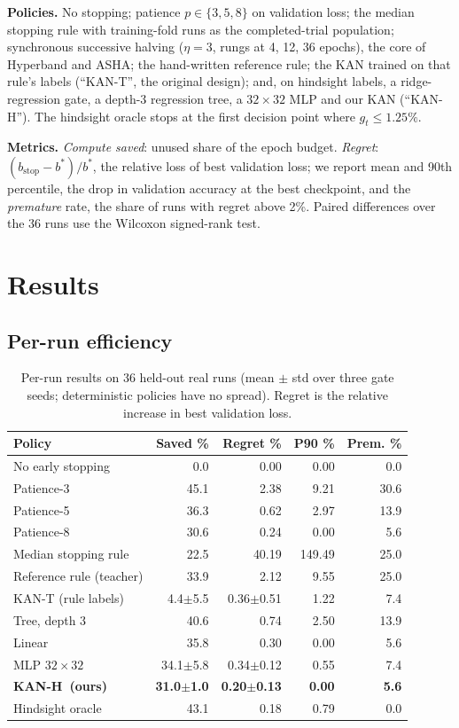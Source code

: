 \documentclass[conference]{IEEEtran}
\newcommand{\ours}{KAN-H}
\begin{document}
\textbf{Policies.} No stopping; patience $p\in\{3,5,8\}$ on validation loss; the median stopping rule with training-fold runs as the completed-trial population; synchronous successive halving ($\eta=3$, rungs at 4, 12, 36 epochs), the core of Hyperband and ASHA; the hand-written reference rule; the KAN trained on that rule's labels (``KAN-T'', the original design); and, on hindsight labels, a ridge-regression gate, a depth-3 regression tree, a $32{\times}32$ MLP and our KAN (``\ours''). The hindsight oracle stops at the first decision point where $g_t\le1.25\%$.

\textbf{Metrics.} \emph{Compute saved}: unused share of the epoch budget. \emph{Regret}: $(b_{\text{stop}}-b^\ast)/b^\ast$, the relative loss of best validation loss; we report mean and 90th percentile, the drop in validation accuracy at the best checkpoint, and the \emph{premature} rate, the share of runs with regret above 2\%. Paired differences over the 36 runs use the Wilcoxon signed-rank test.

\section{Results}
\subsection{Per-run efficiency}
\begin{table}[t]
\centering
\caption{Per-run results on 36 held-out real runs (mean $\pm$ std over three gate seeds; deterministic policies have no spread). Regret is the relative increase in best validation loss.}
\label{tab:main}
\setlength{\tabcolsep}{3pt}
\begin{tabular}{lrrrr}
\toprule
Policy & Saved \% & Regret \% & P90 \% & Prem. \% \\
\midrule
No early stopping & 0.0 & 0.00 & 0.00 & 0.0 \\
Patience-3 & 45.1 & 2.38 & 9.21 & 30.6 \\
Patience-5 & 36.3 & 0.62 & 2.97 & 13.9 \\
Patience-8 & 30.6 & 0.24 & 0.00 & 5.6 \\
Median stopping rule & 22.5 & 40.19 & 149.49 & 25.0 \\
Reference rule (teacher) & 33.9 & 2.12 & 9.55 & 25.0 \\
KAN-T (rule labels) & 4.4$\pm$5.5 & 0.36$\pm$0.51 & 1.22 & 7.4 \\
\midrule
Tree, depth 3 & 40.6 & 0.74 & 2.50 & 13.9 \\
Linear & 35.8 & 0.30 & 0.00 & 5.6 \\
MLP $32{\times}32$ & 34.1$\pm$5.8 & 0.34$\pm$0.12 & 0.55 & 7.4 \\
\textbf{\ours\ (ours)} & \textbf{31.0$\pm$1.0} & \textbf{0.20$\pm$0.13} & \textbf{0.00} & \textbf{5.6} \\
\midrule
Hindsight oracle & 43.1 & 0.18 & 0.79 & 0.0 \\
\bottomrule
\end{tabular}
\end{table}
\end{document}

